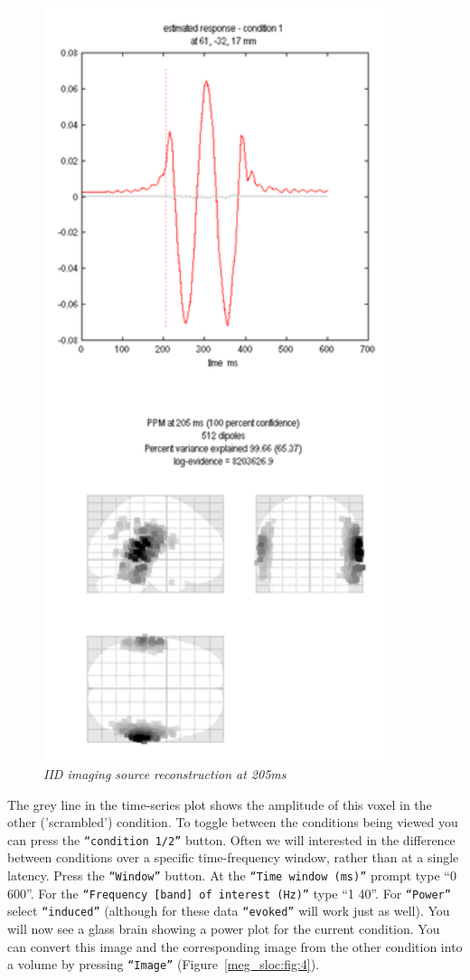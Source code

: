 \begin{figure}
\begin{center}
\includegraphics[width=100mm]{meg_sloc/slide3}
\caption{\em IID imaging source reconstruction at 205ms \label{meg_sloc:fig:3}}
\end{center}
\end{figure}

The grey line in the time-series plot shows the amplitude of this voxel in the other ('scrambled') condition. To toggle between the conditions being viewed you can press the \texttt{``condition 1/2''} button.
Often we will interested in the difference between conditions over a specific time-frequency window, rather than at a single latency. Press the \texttt{``Window''} button. At the \texttt{``Time window (ms)''} prompt type ``0 600''. For the \texttt{``Frequency [band] of interest (Hz)''} type ``1 40''. For \texttt{``Power''} select \texttt{``induced''} (although for these data \texttt{``evoked''} will work just as well). You will now see a glass brain showing a power plot for the current condition. You can convert this image and the corresponding image from the other condition into a volume by pressing \texttt{``Image''} (Figure~\ref{meg_sloc:fig:4}).

